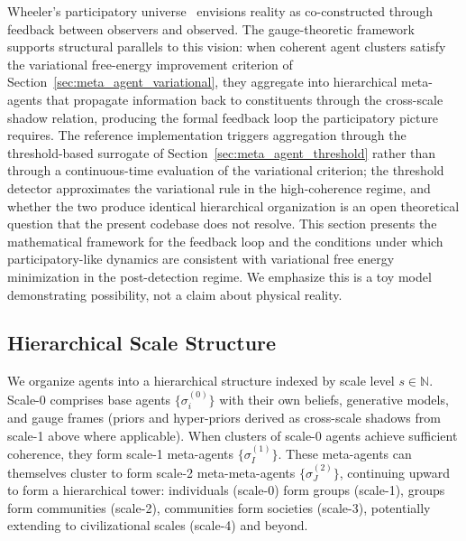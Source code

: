 \documentclass[11pt]{article}
\begin{document}
Wheeler's participatory universe~\cite{Wheeler1983} envisions reality as co-constructed through feedback between observers and observed. The gauge-theoretic framework supports structural parallels to this vision: when coherent agent clusters satisfy the variational free-energy improvement criterion of Section~\ref{sec:meta_agent_variational}, they aggregate into hierarchical meta-agents that propagate information back to constituents through the cross-scale shadow relation, producing the formal feedback loop the participatory picture requires. The reference implementation triggers aggregation through the threshold-based surrogate of Section~\ref{sec:meta_agent_threshold} rather than through a continuous-time evaluation of the variational criterion; the threshold detector approximates the variational rule in the high-coherence regime, and whether the two produce identical hierarchical organization is an open theoretical question that the present codebase does not resolve. This section presents the mathematical framework for the feedback loop and the conditions under which participatory-like dynamics are consistent with variational free energy minimization in the post-detection regime. We emphasize this is a toy model demonstrating possibility, not a claim about physical reality.

\subsection{Hierarchical Scale Structure}

We organize agents into a hierarchical structure indexed by scale level $s \in \mathbb{N}$. Scale-0 comprises base agents $\{\sigma_i^{(0)}\}$ with their own beliefs, generative models, and gauge frames (priors and hyper-priors derived as cross-scale shadows from scale-1 above where applicable). When clusters of scale-0 agents achieve sufficient coherence, they form scale-1 meta-agents $\{\sigma_I^{(1)}\}$. These meta-agents can themselves cluster to form scale-2 meta-meta-agents $\{\sigma_J^{(2)}\}$, continuing upward to form a hierarchical tower: individuals (scale-0) form groups (scale-1), groups form communities (scale-2), communities form societies (scale-3), potentially extending to civilizational scales (scale-4) and beyond.
\end{document}
